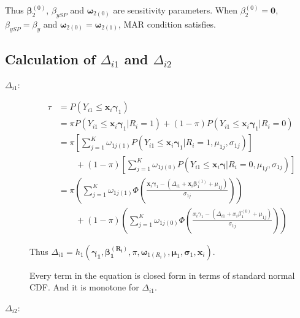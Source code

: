 
Thus $\bm \beta_2^{(0)}$, $\beta_{ySP}$ and $\bm \omega_{2(0)}$ are sensitivity parameters.
When $\beta_2^{(0)} = \bm 0$, $\beta_{ySP} = \beta_y$ and $\bm \omega_{2(0)}= \bm \omega_{2(1)}$, MAR condition satisfies.

\subsection{Calculation of $\Delta_{i1}$ and $\Delta_{i2}$}
\begin{description}
\item[$\Delta_{i1}$:]
\begin{align*}
\tau & = P(Y_{i1} \leq \bm x_i \bm \gamma_1)                                                                                                                           \\
     & = \pi P(Y_{i1} \le \bm x_i \bm \gamma_1 | R_i= 1) +  (1- \pi) P(Y_{i1} \le \bm x_i \bm \gamma_1 | R_i= 0)                                                           \\
     & = \pi \left[ \sum_{j=1}^K \omega_{1j(1)} P(Y_{i1} \le \bm x_i \bm\gamma_1 |R_i = 1, \mu_{1j}, \sigma_{1j}) \right]                                                   \\
     & \qquad  + (1-\pi) \left[ \sum_{j=1}^K \omega_{1j(0)} P(Y_{i1} \le \bm x_i \bm\gamma |R_i = 0, \mu_{1j}, \sigma_{1j}) \right]                                         \\
     & = \pi \left( \sum_{j = 1}^K \omega_{1j(1)} \Phi \left( \frac{\bm x_i \bm\gamma_1 - (\Delta_{i1} + \bm x_i \bm\beta_1^{(1)} + \mu_{1j})}{\sigma_{1j}} \right) \right) \\
     & \qquad + (1 - \pi) \left( \sum_{j = 1}^K \omega_{1j(0)} \Phi \left( \frac{x_i\gamma_1 - (\Delta_{i1} + x_i\beta_1^{(0)} + \mu_{1j})}{\sigma_{1j}} \right) \right)
\end{align*}

Thus $\Delta_{i1} = h_1(\bm{\gamma_1, \beta_1^{(R_i)}}, \pi, \bm \omega_{1(R_i)},\bm \mu_{1}, \bm \sigma_{1}, \bm x_i)$.

Every term in the equation is closed form in terms of standard normal CDF. And it is monotone for $\Delta_{i1}$.

\item[$\Delta_{i2}$:]


\end{description}
